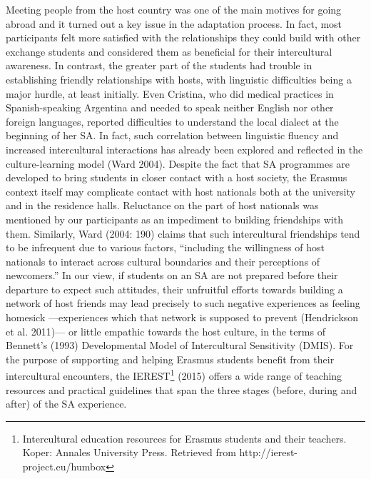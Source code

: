 \documentclass[12pt]{article}
\newenvironment{styleStandard}{\setlength\leftskip{0cm}\setlength\rightskip{0cm plus 1fil}\setlength\parindent{0cm}\setlength\parfillskip{0pt plus 1fil}\setlength\parskip{0in plus 1pt}\writerlistparindent\writerlistleftskip\leavevmode\normalfont\normalsize\writerlistlabel\ignorespaces}{\unskip\vspace{0.111in plus 0.0111in}\par}
\newcommand\writerlistleftskip{}
\newcommand\writerlistparindent{}
\newcommand\writerlistlabel{}
\begin{document}
\begin{styleStandard}
Meeting people from the host country was one of the main motives for going abroad and it turned out a key issue in the adaptation process. In fact, most participants felt more satisfied with the relationships they could build with other exchange students and considered them as beneficial for their intercultural awareness. In contrast, the greater part of the students had trouble in establishing friendly relationships with hosts, with linguistic difficulties being a major hurdle, at least initially. Even Cristina, who did medical practices in Spanish-speaking Argentina and needed to speak neither English nor other foreign languages, reported difficulties to understand the local dialect at the beginning of her SA. In fact, such correlation between linguistic fluency and increased intercultural interactions has already been explored and reflected in the culture-learning model (Ward 2004). Despite the fact that SA programmes are developed to bring students in closer contact with a host society, the Erasmus context itself may complicate contact with host nationals both at the university and in the residence halls. Reluctance on the part of host nationals was mentioned by our participants as an impediment to building friendships with them. Similarly, Ward (2004: 190) claims that such intercultural friendships tend to be infrequent due to various factors, “including the willingness of host nationals to interact across cultural boundaries and their perceptions of newcomers.” In our view, if students on an SA are not prepared before their departure to expect such attitudes, their unfruitful efforts towards building a network of host friends may lead precisely to such negative experiences as feeling homesick —experiences which that network is supposed to prevent (Hendrickson et al. 2011)— or little empathic towards the host culture, in the terms of Bennett’s (1993) Developmental Model of Intercultural Sensitivity (DMIS). For the purpose of supporting and helping Erasmus students benefit from their intercultural encounters, the IEREST\footnote{ Intercultural education resources for Erasmus students and their teachers. Koper: Annales University Press. Retrieved from http://ierest-project.eu/humbox} (2015) offers a wide range of teaching resources and practical guidelines that span the three stages (before, during and after) of the SA experience. \ 
\end{styleStandard}
\end{document}
